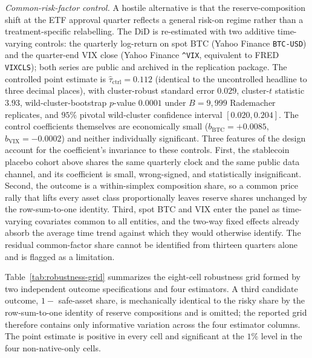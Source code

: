 \documentclass[12pt]{article}
\theoremstyle{sampledef}
\theoremstyle{sampleplain}
\theoremstyle{sampleremark}
\newcommand{\1}{\mathbf{1}}
\begin{document}
\textit{Common-risk-factor control.} A hostile alternative is that
the reserve-composition shift at the ETF approval quarter reflects
a general risk-on regime rather than a treatment-specific
relabelling. The DiD is re-estimated with two additive
time-varying controls: the quarterly log-return on spot BTC
(Yahoo Finance \texttt{BTC-USD}) and the quarter-end VIX close
(Yahoo Finance \texttt{\^{}VIX}, equivalent to FRED
\texttt{VIXCLS}); both series are public and archived in the
replication package. The
controlled point estimate is $\hat\tau_{\text{ctrl}} = 0.112$
(identical to the uncontrolled headline to three decimal places),
with cluster-robust standard error $0.029$, cluster-$t$ statistic
$3.93$, wild-cluster-bootstrap $p$-value $0.0001$ under $B=9{,}999$
Rademacher replicates, and $95\%$ pivotal wild-cluster confidence
interval $[0.020, 0.204]$. The control coefficients themselves are
economically small ($b_{\text{BTC}} = +0.0085$,
$b_{\text{VIX}} = -0.0002$) and neither individually significant.
Three features of the design account for the coefficient's
invariance to these controls. First, the stablecoin placebo cohort
above shares the same quarterly clock and the same public data
channel, and its coefficient is small, wrong-signed, and
statistically insignificant. Second, the outcome is a
within-simplex composition share, so a common price rally that
lifts every asset class proportionally leaves reserve shares
unchanged by the row-sum-to-one identity. Third, spot BTC and VIX
enter the panel as time-varying covariates common to all
entities, and the two-way fixed effects already absorb the
average time trend against which they would otherwise identify.
The residual common-factor share cannot be identified from
thirteen quarters alone and is flagged as a limitation.

Table~\ref{tab:robustness-grid} summarizes the eight-cell
robustness grid formed by two independent outcome specifications
and four estimators. A third candidate outcome,
$1 - $ safe-asset share, is mechanically identical to the risky
share by the row-sum-to-one identity of reserve compositions and
is omitted; the reported grid therefore contains only informative
variation across the four estimator columns. The point estimate
is positive in every cell and significant at the $1\%$ level in
the four non-native-only cells.
\end{document}
